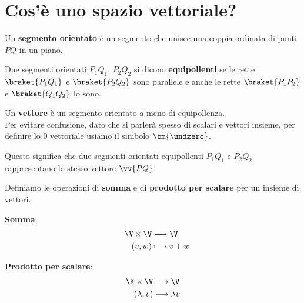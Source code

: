 \documentclass[11pt, a4paper, titlepage, oneside]{scrbook}
\begin{document}
\section{Cos'è uno spazio vettoriale?}

\begin{Definizione}
\label{def-segm-orient}
Un \textbf{segmento orientato} è un segmento che unisce una coppia ordinata di punti $PQ$ in un piano.
\end{Definizione}

\begin{Definizione}
\label{def-segm-equip}
Due segmenti orientati $P_1Q_1$, $P_2Q_2$ si dicono \textbf{equipollenti} se le rette $\braket{P_1Q_1}$ e $\braket{P_2Q_2}$ sono parallele e anche le rette $\braket{P_1P_2}$ e $\braket{Q_1Q_2}$ lo sono.
\end{Definizione}

\begin{Definizione}[Vettore]
\label{def-vett}
Un \textbf{vettore} è un segmento orientato a meno di equipollenza.\\
\NB Per evitare confusione, dato che si parlerà spesso di scalari e vettori insieme, per definire lo $0$ vettoriale usiamo il simbolo $\bm{\undzero}$.
\end{Definizione}

Questo significa che due segmenti orientati equipollenti $P_1Q_1$ e $P_2Q_2$ rappresentano lo stesso vettore $\vv{PQ}$.

Definiamo le operazioni di \textbf{somma} e di \textbf{prodotto per scalare} per un insieme di vettori.

\bigskip

\begin{minipage}[c]{0.45\textwidth}
    \centering
    {\Large\textbf{Somma}:}
    \begin{align*}
        \hspace{0.4cm}\V \times \V &\longrightarrow \V \\
        \hspace{0.4cm}(v,w) &\longmapsto v + w
    \end{align*}
\end{minipage}
\begin{minipage}[c]{0.45\textwidth}
    \centering
    {\Large\textbf{Prodotto per scalare}:}
    \begin{align*}
        \K \times \V &\longrightarrow \V \\
        (\lambda,v) &\longmapsto \lambda v
    \end{align*}
\end{minipage}
\end{document}
